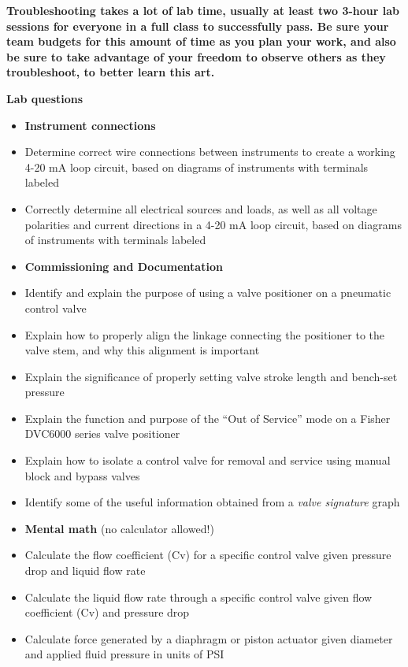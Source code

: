 \documentclass[12pt,a4paper]{article}
\begin{document}
\begin{itemize}
\vskip 10pt

{\bf Troubleshooting takes a lot of lab time, usually at least two 3-hour lab sessions for everyone in a full class to successfully pass.  Be sure your team budgets for this amount of time as you plan your work, and also be sure to take advantage of your freedom to observe others as they troubleshoot, to better learn this art.}



\vfil \eject

\noindent
{\bf Lab questions}

\vskip 5pt

\begin{itemize}
\item{} {\bf Instrument connections}
\item{} Determine correct wire connections between instruments to create a working 4-20 mA loop circuit, based on diagrams of instruments with terminals labeled
\item{} Correctly determine all electrical sources and loads, as well as all voltage polarities and current directions in a 4-20 mA loop circuit, based on diagrams of instruments with terminals labeled
\end{itemize}

\filbreak

\begin{itemize}
\item{} {\bf Commissioning and Documentation}
\item{} Identify and explain the purpose of using a valve positioner on a pneumatic control valve
\item{} Explain how to properly align the linkage connecting the positioner to the valve stem, and why this alignment is important
\item{} Explain the significance of properly setting valve stroke length and bench-set pressure
\item{} Explain the function and purpose of the ``Out of Service'' mode on a Fisher DVC6000 series valve positioner
\item{} Explain how to isolate a control valve for removal and service using manual block and bypass valves
\item{} Identify some of the useful information obtained from a {\it valve signature} graph
\end{itemize}

\filbreak

\begin{itemize}
\item{} {\bf Mental math} (no calculator allowed!)
\item{} Calculate the flow coefficient (Cv) for a specific control valve given pressure drop and liquid flow rate
\item{} Calculate the liquid flow rate through a specific control valve given flow coefficient (Cv) and pressure drop
\item{} Calculate force generated by a diaphragm or piston actuator given diameter and applied fluid pressure in units of PSI
\end{itemize}


\end{itemize}
\end{document}
